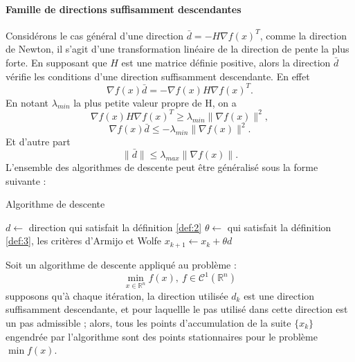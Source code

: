 \paragraph{Famille de directions suffisamment descendantes}
Consid\'erons le cas g\'en\'eral d'une direction $\bar{d}=-H\nabla f(x)^T$, comme la direction de Newton, il s'agit d'une
transformation lin\'eaire de la direction de pente la plus forte. En supposant que $H$ est 
une matrice d\'efinie positive, alors la direction $\bar{d}$ v\'erifie les conditions d'une direction suffisamment 
descendante. En effet
$$\nabla f(x)\bar{d}=-\nabla f(x)H\nabla f(x)^T.$$
En notant $\lambda_{min}$ la plus petite valeur propre de H, on a
$$\nabla f(x)H\nabla f(x)^T \geq \lambda_{min} \lVert \nabla f(x)\rVert^2,$$
$$\nabla f(x)\bar{d}\leq -\lambda_{min}\lVert \nabla f(x)\rVert^2.$$
Et d'autre part $$\lVert \bar{d}\rVert \leq \lambda_{max}\lVert \nabla f(x)\rVert.$$
L'ensemble des algorithmes de descente peut être g\'en\'eralis\'e sous la forme suivante : %
\begin{algorithm}                     %
\caption{Algorithme de descente}          %
\label{alg:1}                           %
\begin{algorithmic}  
\STATE $d \leftarrow$  direction qui satisfait la d\'efinition \ref{def:2}
\STATE $\theta \leftarrow$  qui satisfait la d\'efinition \ref{def:3}, les crit\`eres d'Armijo et Wolfe
\STATE $x_{k+1} \leftarrow x_k+\theta d$
\ENDWHILE
\end{algorithmic}
\end{algorithm}


\begin{frtheoreme}
Soit un algorithme de descente appliqu\'e au probl\`eme :\\
$$\min_{x\in \mathbb{R}^n} f(x), \ f \in \mathcal{C}^1(\mathbb{R}^n)$$
supposons qu'\`a chaque it\'eration, la direction utilis\'ee $d_k$ est une direction suffisamment descendante,
 et pour laquellle le pas utilis\'e dans cette direction est un pas admissible ; alors, tous les points
d’accumulation de la suite $\{x_k\}$ engendr\'ee par l'algorithme sont des points stationnaires pour le
probl\`eme $\min f(x)$.
\end{frtheoreme}




